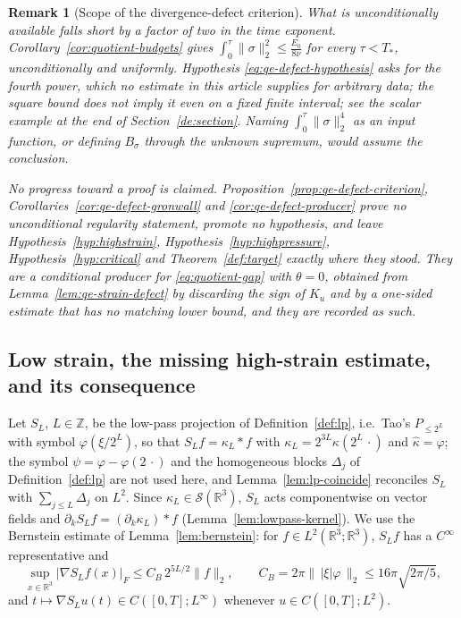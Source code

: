 \documentclass[11pt]{article}
\newtheorem{remark}[theorem]{Remark}
\theoremstyle{definition}
\theoremstyle{plain}
\newcommand{\R}{\mathbb R}
\newcommand{\norm}[1]{\lVert #1\rVert}
\begin{document}
\begin{remark}[Scope of the divergence-defect criterion]
\emph{What is unconditionally available falls short by a factor of two in
the time exponent.}  Corollary~\ref{cor:quotient-budgets} gives
$\int_0^\tau\norm\sigma_2^2\le\frac{E_0}{8\nu}$ for every $\tau<T_*$,
unconditionally and uniformly.  Hypothesis
\eqref{eq:qe-defect-hypothesis} asks for the \emph{fourth} power, which no
estimate in this article supplies for arbitrary data; the square bound does
not imply it even on a fixed finite interval; see the scalar example
at the end of Section~\ref{de:section}.  Naming
$\int_0^\tau\norm\sigma_2^4$ as an input function, or defining $B_\sigma$
through the unknown supremum, would assume the conclusion.

\emph{No progress toward a proof is claimed.}
Proposition~\ref{prop:qe-defect-criterion},
Corollaries~\ref{cor:qe-defect-gronwall} and
\ref{cor:qe-defect-producer} prove no unconditional regularity statement,
promote no hypothesis, and leave Hypothesis~\ref{hyp:highstrain},
Hypothesis~\ref{hyp:highpressure}, Hypothesis~\ref{hyp:critical} and
Theorem~\ref{def:target} exactly where they stood.  They are a conditional
producer for \eqref{eq:quotient-gap} with $\theta=0$, obtained from
Lemma~\ref{lem:qe-strain-defect} by discarding the sign of $K_u$ and by a
one-sided estimate that has no matching lower bound, and they are recorded
as such.
\end{remark}


\subsection{Low strain, the missing high-strain estimate, and its consequence}
\label{subsec:qe-highstrain}

Let $S_L$, $L\in\mathbb Z$, be the low-pass projection of
Definition~\ref{def:lp}, i.e.\ Tao's $P_{\le2^L}$ with symbol
$\varphi(\xi/2^L)$, so that $S_Lf=\kappa_L*f$ with
$\kappa_L=2^{3L}\kappa(2^L\,\cdot)$ and $\hat\kappa=\varphi$; the symbol
$\psi=\varphi-\varphi(2\,\cdot)$ and the homogeneous blocks $\Delta_j$ of
Definition~\ref{def:lp} are not used here, and
Lemma~\ref{lem:lp-coincide} reconciles $S_L$ with $\sum_{j\le L}\Delta_j$
on $L^2$.  Since $\kappa_L\in\mathcal S(\R^3)$, $S_L$ acts componentwise
on vector fields and $\partial_kS_Lf=(\partial_k\kappa_L)*f$
(Lemma~\ref{lem:lowpass-kernel}).  We use the Bernstein estimate of
Lemma~\ref{lem:bernstein}: for $f\in L^2(\R^3;\R^3)$, $S_Lf$ has a
$C^\infty$ representative and
\begin{equation}\label{eq:qe-bernstein}
 \sup_{x\in\R^3}\bigl|\nabla S_Lf(x)\bigr|_F\le C_B\,2^{5L/2}\norm f_2 ,
 \qquad C_B=2\pi\norm{\,|\xi|\varphi\,}_2\le16\pi\sqrt{2\pi/5},
\end{equation}
and $t\mapsto\nabla S_Lu(t)\in C([0,T];L^\infty)$ whenever
$u\in C([0,T];L^2)$.
\end{document}
